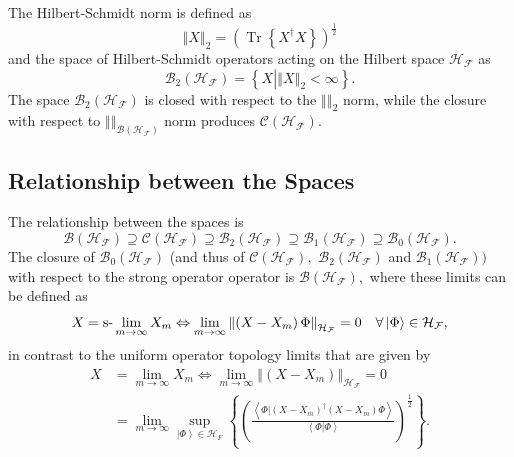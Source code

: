 \documentclass[aps,preprint,amsfonts,amssymb,showpacs,showkeys]{revtex4}%
\begin{document}
The Hilbert-Schmidt norm is defined as
\begin{equation}
\left\Vert X\right\Vert _{2}=\left(  \operatorname*{Tr}\left\{  X^{\dagger
}X\right\}  \right)  ^{\frac{1}{2}}%
\end{equation}
and the space of Hilbert-Schmidt operators acting on the Hilbert space
$\mathcal{H}_{\mathcal{F}}$ as
\begin{equation}
\mathcal{B}_{2}\left(  \mathcal{H}_{\mathcal{F}}\right)  =\left\{  X\left\vert
\left\Vert X\right\Vert _{2}<\infty\right.  \right\}  .
\end{equation}
The space $\mathcal{B}_{2}\left(  \mathcal{H}_{\mathcal{F}}\right)  $ is
closed with respect to the $\left\Vert {}\right\Vert _{2}$ norm, while the
closure with respect to $\left\Vert {}\right\Vert _{\mathcal{B}\left(
\mathcal{H}_{\mathcal{F}}\right)  }$ norm produces $\mathcal{C}\left(
\mathcal{H}_{\mathcal{F}}\right)  .$

\subsection{Relationship between the Spaces}

The relationship between the spaces is
\begin{equation}
\mathcal{B}\left(  \mathcal{H}_{\mathcal{F}}\right)  \supseteq\mathcal{C}%
\left(  \mathcal{H}_{\mathcal{F}}\right)  \supseteq\mathcal{B}_{2}\left(
\mathcal{H}_{\mathcal{F}}\right)  \supseteq\mathcal{B}_{1}\left(
\mathcal{H}_{\mathcal{F}}\right)  \supseteq\mathcal{B}_{0}\left(
\mathcal{H}_{\mathcal{F}}\right)  .
\end{equation}
The closure of $\mathcal{B}_{0}\left(  \mathcal{H}_{\mathcal{F}}\right)  $
(and thus of $\mathcal{C}\left(  \mathcal{H}_{\mathcal{F}}\right)  ,$
$\mathcal{B}_{2}\left(  \mathcal{H}_{\mathcal{F}}\right)  $ and $\mathcal{B}%
_{1}\left(  \mathcal{H}_{\mathcal{F}}\right)  )$ with respect to the strong
operator operator is $\mathcal{B}\left(  \mathcal{H}_{\mathcal{F}}\right)  ,$
where these limits can be defined as
\begin{equation}
X=\text{\textrm{s-}}\lim_{m\rightarrow\infty}X_{m}\Leftrightarrow
\lim_{m\rightarrow\infty}\left\Vert \left(  X-X_{m}\right)  \Phi\right\Vert
_{\mathcal{H}_{\mathcal{F}}}=0\quad\forall\left\vert \Phi\right\rangle
\in\mathcal{H}_{\mathcal{F}},
\end{equation}
in contrast to the uniform operator topology limits that are given by%
\begin{align}
X  &  =\lim_{m\rightarrow\infty}X_{m}\Leftrightarrow\lim_{m\rightarrow\infty
}\left\Vert \left(  X-X_{m}\right)  \right\Vert _{\mathcal{H}_{\mathcal{F}}%
}=0\nonumber\\
&  =\lim_{m\rightarrow\infty}\sup_{\left\vert \Phi\right\rangle \in
\mathcal{H}_{F}}\left\{  \left(  \frac{\left\langle \left.  \Phi\right\vert
\left(  X-X_{m}\right)  ^{\dagger}\left(  X-X_{m}\right)  \Phi\right\rangle
}{\left\langle \left.  \Phi\right\vert \Phi\right\rangle }\right)  ^{\frac
{1}{2}}\right\}  .
\end{align}
\end{document}
